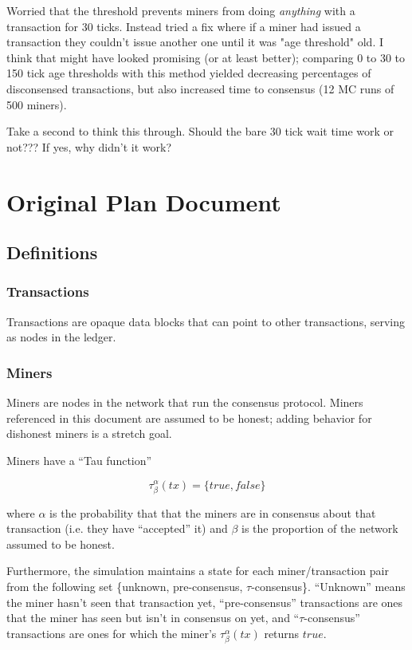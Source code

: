 \documentclass[letterpaper,11pt]{article}
\begin{document}
Worried that the threshold prevents miners from doing \textit{anything} with a transaction for 30 ticks. Instead tried a fix where if a miner had issued a transaction they couldn't issue another one until it was "age threshold" old. I think that might have looked promising (or at least better); comparing 0 to 30 to 150 tick age thresholds with this method yielded decreasing percentages of disconsensed transactions, but also increased time to consensus (12 MC runs of 500 miners).

Take a second to think this through. Should the bare 30 tick wait time work or not??? If yes, why didn't it work?

\section{Original Plan Document}

\subsection{Definitions}

\subsubsection{Transactions}
Transactions are opaque data blocks that can point to other transactions, serving as nodes in the ledger.

\subsubsection{Miners}
Miners are nodes in the network that run the consensus protocol. Miners referenced in this document are assumed to be honest; adding behavior for dishonest miners is a stretch goal.

Miners have a ``Tau function''

\[\tau_\beta^\alpha(tx) = \{true,false\}\]

where $\alpha$ is the probability that that the miners are in consensus about that transaction (i.e. they have ``accepted'' it) and $\beta$ is the proportion of the network assumed to be honest.

Furthermore, the simulation maintains a state for each miner/transaction pair from the following set \{unknown, pre-consensus, $\tau$-consensus\}. ``Unknown'' means the miner hasn't seen that transaction yet, ``pre-consensus'' transactions are ones that the miner has seen but isn't in consensus on yet, and ``$\tau$-consensus'' transactions are ones for which the miner's $\tau_\beta^\alpha(tx)$ returns $true$.
\end{document}
